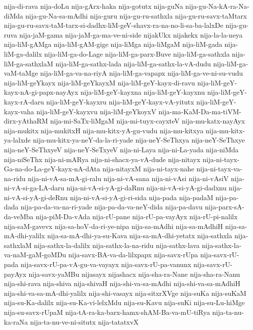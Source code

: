 {nija-di-rava
nija-doLu
nija-gArx-haka
nija-gotutx
nija-guNa
nija-gu-Na-kA-ra-Na-diMda
nija-gu-Na-sa-mAdhi
nija-guru
nija-gu-ru-sathxla
nija-gu-ru-savx-taMtarx
nija-gu-ru-savx-taM-tarx-si-dadhx-liM-geV-shavx-ra-na-no-li-sa-ba-lalxDe
nija-gu-ruva
nija-jaM-gama
nija-jaM-ga-ma-ve-ni-side
nijakUkx
nijakekx
nija-la-la-neya
nija-liM-gAMga
nija-liM-gAM-gige
nija-liMga
nija-liMgaM
nija-liM-gada
nija-liM-ga-dalilx
nija-liM-ga-do-Lage
nija-liM-ga-parx-Buve
nija-liM-ga-sathxla
nija-liM-ga-sathxlaM
nija-liM-ga-sathx-lada
nija-liM-ga-sathx-la-vA-dudu
nija-liM-ga-vaM-taMge
nija-liM-ga-va-na-riyA
nija-liM-ga-vapapx
nija-liM-ga-ve-ni-su-vudu
nija-liM-geYkayx
nija-liM-geYkayxM
nija-liM-geY-kayx-di-ravu
nija-liM-geY-kayx-nA-gi-papx-nayAyx
nija-liM-geY-kayxna
nija-liM-geY-kayxnu
nija-liM-geY-kayx-rA-daru
nija-liM-geY-kayxru
nija-liM-geY-kayx-vA-yitutx
nija-liM-geY-kayx-vaha
nija-liM-geY-kayxvu
nija-liM-geYkoyxV
nija-ma-KaM-Da-ma-tiVM-dirx-yAthaRM
nija-mi-SaTx-liMgaM
nija-mi-tuyx-cayxteV
nija-mu-katx-nayAyx
nija-mukitx
nija-mukitxH
nija-mu-kitx-yA-gu-vudu
nija-mu-kitxya
nija-mu-kitx-ya-lalxde
nija-mu-kitx-ya-neY-da-la-ri-yade
nija-neY-SeThxya
nija-neY-SeThxye
nija-neY-SeThxyeV
nija-neY-SeTxyeV
nija-ni-Laya
nija-ni-La-yada
nija-niMda
nija-niSeThx
nija-ni-mARya
nija-ni-shacx-ya-vA-dude
nija-nitayx
nija-ni-tayx-Ga-na-do-La-geY-kayx-nA-dAta
nija-nitayxM
nija-ni-tayx-nahe
nija-ni-tayx-va-na-ridu
nija-ni-vA-sa-mA-gi-ralu
nija-ni-vA-sana
nija-ni-vAsi
nija-ni-vAsiV
nija-ni-vA-si-ga-LA-daru
nija-ni-vA-si-yA-gi-daRnu
nija-ni-vA-si-yA-gi-dadxnu
nija-ni-vA-si-yA-gi-deRnu
nija-ni-vA-si-yA-gi-ri-sida
nija-pada
nija-padaM
nija-pa-dada
nija-pa-da-va-na-ri-yade
nija-pa-da-va-neY-dida
nija-pa-davu
nija-parx-sA-da-veMba
nija-piM-Da-vAda
nija-rU-pane
nija-rU-pa-vayAyx
nija-rU-pi-nalilx
nija-saM-gavevx
nija-sa-hoV-da-ri-ye-nipa
nija-sa-mAdhi
nija-sa-mAdhiH
nija-sa-mA-dhi-yalilx
nija-sa-mA-dhi-ya-su-Kava
nija-sa-mA-dhi-yetatx
nija-sathxla
nija-sathxlaM
nija-sathx-la-dalilx
nija-sathx-la-na-ridu
nija-sathx-lava
nija-sathx-la-va-naM-gaM-goMDu
nija-savx-BA-va-da-lilxpapx
nija-savx-rUpa
nija-savx-rU-pada
nija-savx-rU-pa-vA-gu-va-vayayx
nija-savx-rU-pa-vanunx
nija-savx-rU-payAyx
nija-savx-yaMBu
nijasayx
nijashacx
nija-sha-ra-Nane
nija-sha-ra-Nanu
nija-shi-rava
nija-shiva
nija-shivaH
nija-shi-va-sa-mAdhi
nija-shi-va-sa-mAdhiH
nija-shi-va-sa-mA-dhi-yalilx
nija-shi-vasayx
nija-sitxrXVge
nija-suKa
nija-suKaM
nija-su-Ka-dalilx
nija-su-Ka-vi-lelxMdu
nija-su-Kavu
nija-suKi
nija-su-Lu-hiMge
nija-su-savx-rUpaM
nija-tA-ra-ka-barx-hamx-shAM-Ba-va-mU-tiRya
nija-ta-nu-ka-raNa
nija-ta-nu-ve-ni-situtx
nija-tatatxvX
}
